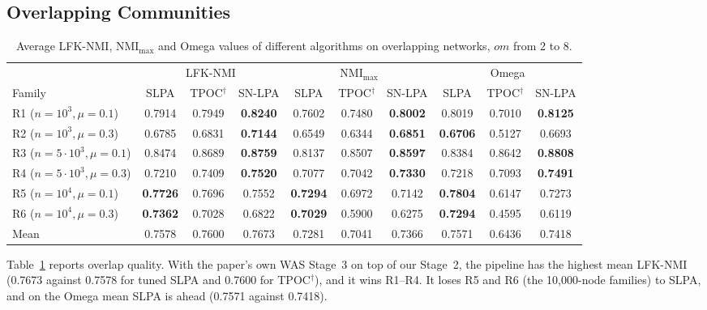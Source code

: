 \documentclass[conference]{IEEEtran}
\begin{document}
\subsection{Overlapping Communities}
\begin{table}[!tp]
\centering
\caption{Average LFK-NMI, $\mathrm{NMI}_{\max}$ and Omega values of different algorithms on overlapping networks, $om$ from 2 to 8.}
\label{tab:ov}
\footnotesize
\begin{tabular*}{\textwidth}{@{\extracolsep{\fill}}lccc|ccc|ccc}
\toprule
 & \multicolumn{3}{c|}{LFK-NMI} & \multicolumn{3}{c|}{$\mathrm{NMI}_{\max}$} & \multicolumn{3}{c}{Omega} \\
Family & SLPA & TPOC$^{\dagger}$ & SN-LPA & SLPA & TPOC$^{\dagger}$ & SN-LPA & SLPA & TPOC$^{\dagger}$ & SN-LPA \\
\midrule
R1 ($n{=}10^3,\mu{=}0.1$) & 0.7914 & 0.7949 & \textbf{0.8240} & 0.7602 & 0.7480 & \textbf{0.8002} & 0.8019 & 0.7010 & \textbf{0.8125} \\
R2 ($n{=}10^3,\mu{=}0.3$) & 0.6785 & 0.6831 & \textbf{0.7144} & 0.6549 & 0.6344 & \textbf{0.6851} & \textbf{0.6706} & 0.5127 & 0.6693 \\
R3 ($n{=}5{\cdot}10^3,\mu{=}0.1$) & 0.8474 & 0.8689 & \textbf{0.8759} & 0.8137 & 0.8507 & \textbf{0.8597} & 0.8384 & 0.8642 & \textbf{0.8808} \\
R4 ($n{=}5{\cdot}10^3,\mu{=}0.3$) & 0.7210 & 0.7409 & \textbf{0.7520} & 0.7077 & 0.7042 & \textbf{0.7330} & 0.7218 & 0.7093 & \textbf{0.7491} \\
R5 ($n{=}10^4,\mu{=}0.1$) & \textbf{0.7726} & 0.7696 & 0.7552 & \textbf{0.7294} & 0.6972 & 0.7142 & \textbf{0.7804} & 0.6147 & 0.7273 \\
R6 ($n{=}10^4,\mu{=}0.3$) & \textbf{0.7362} & 0.7028 & 0.6822 & \textbf{0.7029} & 0.5900 & 0.6275 & \textbf{0.7294} & 0.4595 & 0.6119 \\
\midrule
Mean & 0.7578 & 0.7600 & 0.7673 & 0.7281 & 0.7041 & 0.7366 & 0.7571 & 0.6436 & 0.7418 \\
\bottomrule
\end{tabular*}
\end{table}
Table~\ref{tab:ov} reports overlap quality. With the paper's own WAS Stage~3 on top of our Stage~2, the pipeline has the highest mean LFK-NMI (0.7673 against 0.7578 for tuned SLPA and 0.7600 for TPOC$^{\dagger}$), and it wins R1--R4. It loses R5 and R6 (the 10{,}000-node families) to SLPA, and on the Omega mean SLPA is ahead (0.7571 against 0.7418).
\end{document}
